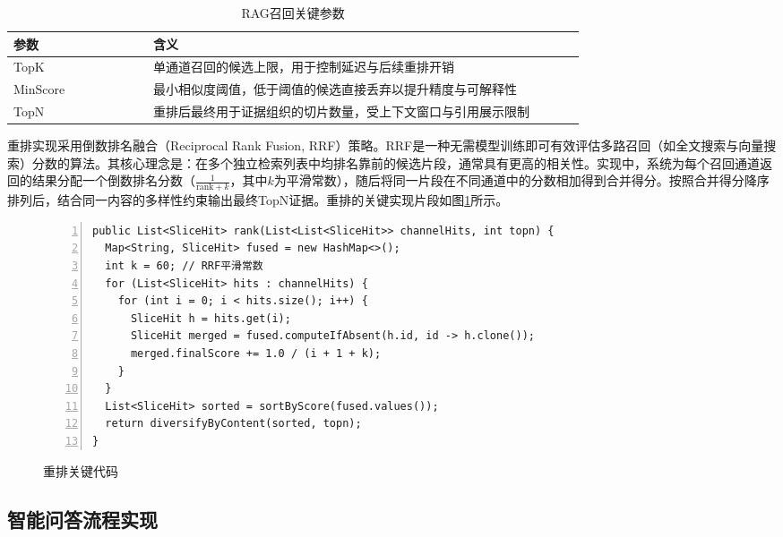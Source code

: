 \begin{table}[!htbp]
  \centering
  \caption{RAG召回关键参数}
  \label{tab:rag_params}
  \small
  \begin{tabular}{>{\raggedright\arraybackslash}p{0.22\linewidth}|>{\raggedright\arraybackslash}p{0.68\linewidth}}
    \hline
    参数 & 含义 \\ \hline
    TopK & 单通道召回的候选上限，用于控制延迟与后续重排开销 \\ \hline
    MinScore & 最小相似度阈值，低于阈值的候选直接丢弃以提升精度与可解释性 \\ \hline
    TopN & 重排后最终用于证据组织的切片数量，受上下文窗口与引用展示限制 \\ \hline
  \end{tabular}
\end{table}

重排实现采用倒数排名融合（Reciprocal Rank Fusion, RRF）策略\cite{bruch2023analysis}。RRF是一种无需模型训练即可有效评估多路召回（如全文搜索与向量搜索）分数的算法。其核心理念是：在多个独立检索列表中均排名靠前的候选片段，通常具有更高的相关性。实现中，系统为每个召回通道返回的结果分配一个倒数排名分数（$\frac{1}{\text{rank} + k}$，其中$k$为平滑常数），随后将同一片段在不同通道中的分数相加得到合并得分。按照合并得分降序排列后，结合同一内容的多样性约束输出最终TopN证据。重排的关键实现片段如图\ref{fig:rag_rerank_key_code}所示。

\begin{figure}[!htbp]
  \centering
  \begin{minipage}{0.94\linewidth}
    \begin{lstlisting}[basicstyle=\ttfamily\small,numbers=left,numberstyle=\tiny,frame=single,breaklines=true]
public List<SliceHit> rank(List<List<SliceHit>> channelHits, int topn) {
  Map<String, SliceHit> fused = new HashMap<>();
  int k = 60; // RRF平滑常数
  for (List<SliceHit> hits : channelHits) {
    for (int i = 0; i < hits.size(); i++) {
      SliceHit h = hits.get(i);
      SliceHit merged = fused.computeIfAbsent(h.id, id -> h.clone());
      merged.finalScore += 1.0 / (i + 1 + k);
    }
  }
  List<SliceHit> sorted = sortByScore(fused.values());
  return diversifyByContent(sorted, topn);
}
    \end{lstlisting}
  \end{minipage}
  \caption{重排关键代码}
  \label{fig:rag_rerank_key_code}
\end{figure}

\subsection{智能问答流程实现}
\label{subsec:impl_ca_rag}

